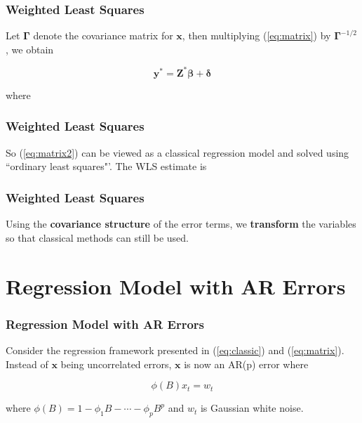 \documentclass[%
xcolor=pdftex]{beamer}
\begin{document}
\begin{frame}
\frametitle{Weighted Least Squares}

Let $\boldsymbol{\Gamma}$ denote the covariance matrix for $\boldsymbol{x}$, then multiplying (\ref{eq:matrix}) by $\boldsymbol{\Gamma}^{-1/2}$, we obtain\\

\vspace{15mm}

\begin{equation} \label{eq:matrix2}
\boldsymbol{y^*} = \boldsymbol{Z^* \beta} + \boldsymbol{\delta}
\end{equation}

where

\vspace{30mm}

\end{frame}

\begin{frame}
\frametitle{Weighted Least Squares}

So (\ref{eq:matrix2}) can be viewed as a classical regression model and solved using ``ordinary least squares"'. The WLS estimate is

\vspace{50mm}

\end{frame}

\begin{frame}
\frametitle{Weighted Least Squares}

Using the \textbf{covariance structure} of the error terms, we \textbf{transform} the variables so that classical methods can still be used. 

\end{frame}

\section{Regression Model with AR Errors}
\frame{\tableofcontents[currentsection]}

\begin{frame}
\frametitle{Regression Model with AR Errors}

Consider the regression framework presented in (\ref{eq:classic}) and (\ref{eq:matrix}). Instead of $\boldsymbol{x}$ being uncorrelated errors, $\boldsymbol{x}$ is now an AR(p) error where

\begin{equation*}
\phi(B)x_t = w_t
\end{equation*}

where $\phi(B) = 1- \phi_1 B - \cdots - \phi_p B^p$ and $w_t$ is Gaussian white noise. 

\end{frame}
\end{document}
